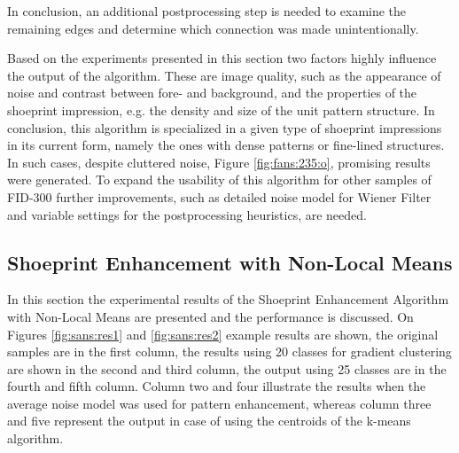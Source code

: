 \documentclass[draft,final]{vutinfth} %
\begin{document}
In conclusion, an additional postprocessing step is needed to examine the remaining edges and determine which connection was made unintentionally.
\par
Based on the experiments presented in this section two factors highly influence the output of the algorithm.
These are image quality, such as the appearance of noise and contrast between fore- and background, and the properties of the shoeprint impression, e.g. the density and size of the unit pattern structure.
In conclusion, this algorithm is specialized in a given type of shoeprint impressions in its current form, namely the ones with dense patterns or fine-lined structures. 
In such cases, despite cluttered noise, Figure \ref{fig:fans:235:o}, promising results were generated.
To expand the usability of this algorithm for other samples of FID-300 further improvements, such as detailed noise model for Wiener Filter and variable settings for the postprocessing heuristics, are needed. 

\subsection{Shoeprint Enhancement with Non-Local Means}
\par
In this section the experimental results of the Shoeprint Enhancement Algorithm with Non-Local Means are presented and the performance is discussed.
On Figures \ref{fig:sans:res1} and \ref{fig:sans:res2} example results are shown, the original samples are in the first column, the results using 20 classes for gradient clustering are shown in the second and third column, the output using 25 classes are in the fourth and fifth column.
Column two and four illustrate the results when the average noise model was used for pattern enhancement, whereas column three and five represent the output in case of using the centroids of the k-means algorithm.
\end{document}
